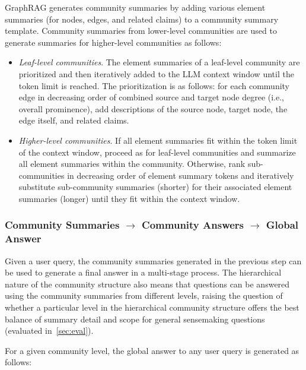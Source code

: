 \documentclass{article}
\begin{document}
GraphRAG generates community summaries by adding various element summaries (for nodes, edges, and related claims) to a community summary template.
Community summaries from lower-level communities are used to generate summaries for higher-level communities as follows:

\begin{itemize}
    \item \emph{Leaf-level communities}. The element summaries of a leaf-level community  are prioritized and then iteratively added to the LLM context window until the token limit is reached.
    The prioritization is as follows: for each community edge in decreasing order of combined source and target node degree (i.e., overall prominence), add descriptions of the source node, target node, the edge itself, and related claims.
    \item \emph{Higher-level communities}. If all element summaries fit within the token limit of the context window, proceed as for leaf-level communities and summarize all element summaries within the community.
    Otherwise, rank sub-communities in decreasing order of element summary tokens and iteratively substitute sub-community summaries (shorter) for their associated element summaries (longer) until they fit within the context window.
\end{itemize}

\subsubsection{Community Summaries \texorpdfstring{$\rightarrow$}{-->} Community Answers \texorpdfstring{$\rightarrow$}{-->} Global Answer}
\label{sec:querytime}

Given a user query, the community summaries generated in the previous step can be used to generate a final answer in a multi-stage process.
The hierarchical nature of the community structure also means that questions can be answered using the community summaries from different levels, raising the question of whether a particular level in the hierarchical community structure offers the best balance of summary detail and scope for general sensemaking questions (evaluated in~\autoref{sec:eval}).

For a given community level, the global answer to any user query is generated as follows:  
\end{document}
